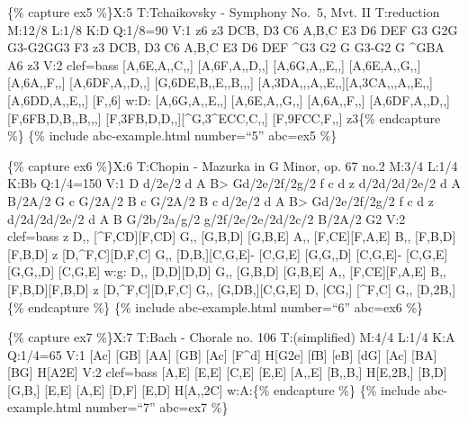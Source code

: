 \documentclass{book}
\begin{document}
\{\% capture ex5 \%\}X:5 T:Tchaikovsky - Symphony No.~5, Mvt. II T:reduction
M:12/8 L:1/8 K:D Q:1/8=90 V:1 z6 z3 DCB,\textbar{} D3 C6 A,B,C\textbar{} E3 D6
DEF\textbar{} G3 G2G G3-G2G\textbar G3 F3 z3 DCB,\textbar{} D3 C6
A,B,C\textbar{} E3 D6 DEF\textbar{} \^{}G3 G2 G G3-G2 G\textbar{} \^{}GBA A6
z3\textbar{]} V:2 clef=bass {[}A,6E,A,,C,,{]} {[}A,6F,A,,D,,{]}\textbar{}
{[}A,6G,A,,E,,{]} {[}A,6E,A,,G,,{]}\textbar{} {[}A,6A,,F,,{]}
{[}A,6DF,A,,D,,{]}\textbar{} {[}G,6DE,B,,E,,B,,,{]}
{[}A,3DA,,,A,,E,,{]}{[}A,3CA,,,A,,E,,{]}\textbar{} {[}A,6DD,A,,E,,{]}
{[}F,,6{]}\textbar{} w:D: {[}A,6G,A,,E,,{]} {[}A,6E,A,,G,,{]}\textbar{}
{[}A,6A,,F,,{]} {[}A,6DF,A,,D,,{]}\textbar{} {[}F,6FB,D,B,,B,,,{]}
{[}F,3FB,D,D,,{]}{[}\^{}G,3\^{}ECC,C,,{]}\textbar{} {[}F,9FCC,F,,{]}
z3\textbar{]}\{\% endcapture \%\} \{\% include abc-example.html number=``5''
abc=ex5 \%\}

\{\% capture ex6 \%\}X:6 T:Chopin - Mazurka in G Minor, op. 67 no.2 M:3/4
L:1/4 K:Bb Q:1/4=150 V:1 D\textbar{} d/2e/2 d A\textbar{} B\textgreater{}
Gd/2e/2\textbar f/2g/2 f c\textbar{} d z d/2d/2\textbar d/2e/2 d A\textbar{}
B/2A/2 G c\textbar{} G/2A/2 B c\textbar{} G/2A/2 B c\textbar{} d/2e/2 d
A\textbar{} B\textgreater{} Gd/2e/2\textbar f/2g/2 f c\textbar{} d z
d/2d/2\textbar d/2e/2 d A\textbar{} B G/2b/2a/g/2\textbar{}
g/2f/2e/2e/2d/2c/2\textbar{} B/2A/2 G2\textbar{]} V:2 clef=bass z\textbar{}
D,, {[}\^{}F,CD{]}{[}F,CD{]}\textbar{} G,, {[}G,B,D{]} {[}G,B,E{]}\textbar{}
A,, {[}F,CE{]}{[}F,A,E{]}\textbar{} B,, {[}F,B,D{]}{[}F,B,D{]}\textbar{} z
{[}D,\^{}F,C{]}{[}D,F,C{]}\textbar{} G,, {[}D,B,{]}{[}C,G,E{]}-\textbar{}
{[}C,G,E{]} {[}G,G,,D{]} {[}C,G,E{]}-\textbar{} {[}C,G,E{]} {[}G,G,,D{]}
{[}C,G,E{]}\textbar{} w:g: D,, {[}D,D{]}{[}D,D{]}\textbar{} G,, {[}G,B,D{]}
{[}G,B,E{]}\textbar{} A,, {[}F,CE{]}{[}F,A,E{]}\textbar{} B,,
{[}F,B,D{]}{[}F,B,D{]}\textbar{} z {[}D,\^{}F,C{]}{[}D,F,C{]}\textbar{} G,,
{[}G,DB,{]}{[}C,G,E{]}\textbar{} D, {[}CG,{]} {[}\^{}F,C{]}\textbar{} G,,
{[}D,2B,{]}\textbar{]}{]}\{\% endcapture \%\} \{\% include abc-example.html
number=``6'' abc=ex6 \%\}

\{\% capture ex7 \%\}X:7 T:Bach - Chorale no. 106 T:(simplified) M:4/4 L:1/4
K:A Q:1/4=65 V:1 {[}Ac{]} {[}GB{]} {[}AA{]} {[}GB{]}\textbar{} {[}Ac{]}
{[}F\^{}d{]} H{[}G2e{]}\textbar{} {[}fB{]} {[}eB{]} {[}dG{]}
{[}Ac{]}\textbar{} {[}BA{]} {[}BG{]} H{[}A2E{]}\textbar{]} V:2 clef=bass
{[}A,E{]} {[}E,E{]} {[}C,E{]} {[}E,E{]}\textbar{} {[}A,,E{]} {[}B,,B,{]}
H{[}E,2B,{]}\textbar{} {[}B,D{]} {[}G,B,{]} {[}E,E{]} {[}A,E{]}\textbar{}
{[}D,F{]} {[}E,D{]} H{[}A,,2C{]}\textbar{} w:A:\{\% endcapture \%\} \{\%
include abc-example.html number=``7'' abc=ex7 \%\}
\end{document}
